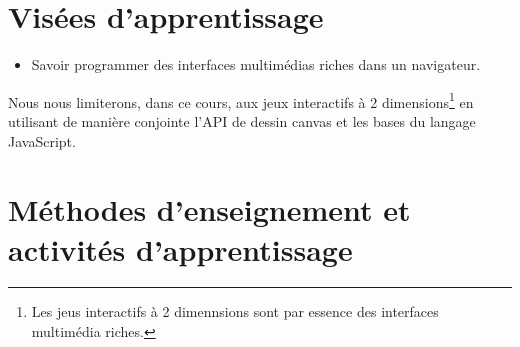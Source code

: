 \clearpage
\section{Visées d’apprentissage}
\begin{itemize}
    \item Savoir programmer des interfaces multimédias riches dans un navigateur.
\end{itemize}

Nous nous limiterons, dans ce cours, aux jeux interactifs à 2 dimensions\footnote{Les jeus interactifs à 2 dimennsions sont par essence des interfaces multimédia riches.} en utilisant de manière conjointe l’API de dessin canvas et les bases du langage JavaScript.

\section{Méthodes d’enseignement et activités d’apprentissage}

